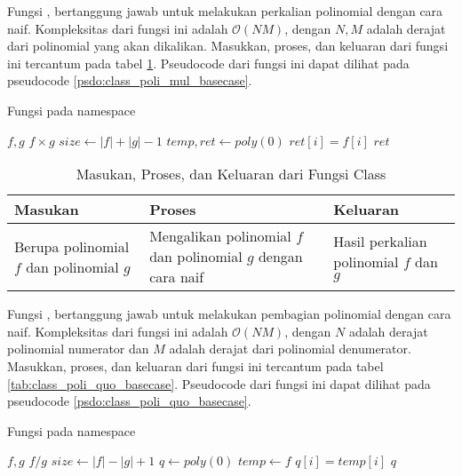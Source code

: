 \newpage

Fungsi , bertanggung jawab untuk melakukan perkalian polinomial dengan cara naif. Kompleksitas dari fungsi ini adalah $ \mathcal{O}{(NM)} $, dengan $ N , M $ adalah derajat dari polinomial yang akan dikalikan. Masukkan, proses, dan keluaran dari fungsi ini tercantum pada tabel \ref{tab:class_poli_mul_basecase}. Pseudocode dari fungsi ini dapat dilihat pada pseudocode \ref{psdo:class_poli_mul_basecase}.

\begin{algorithm}
	\caption{Fungsi  pada namespace }
	\label{psdo:class_poli_mul_basecase}
	\begin{algorithmic}[1]
		\Require $ f, g $
		\Ensure $ f \times g $
		\State $ size \leftarrow |f|+|g|-1 $
		\State $ temp, ret \leftarrow poly(0) $
				\State {}
			\EndIf
		\EndFor
			\State $ ret[i] = f[i] $
		\EndFor
		\State \Return $ ret $
	\end{algorithmic}
\end{algorithm}

\begin{table}[]	
	\Centering
	\begin{tabular}{|p{3cm}|p{3cm}|p{3cm}|}
	\hline
	Masukan & Proses & Keluaran \\ \hline
	Berupa polinomial $f$ dan polinomial $g$ & Mengalikan polinomial $f$ dan polinomial $g$ dengan cara naif & Hasil perkalian polinomial $f$ dan $g$\\ \hline
	\end{tabular}
	\caption{Masukan, Proses, dan Keluaran dari Fungsi  Class }
	\label{tab:class_poli_mul_basecase}
\end{table}

\newpage

Fungsi , bertanggung jawab untuk melakukan pembagian polinomial dengan cara naif. Kompleksitas dari fungsi ini adalah $ \mathcal{O}{(NM)} $, dengan $ N $ adalah derajat polinomial numerator dan $ M $ adalah derajat dari polinomial denumerator. Masukkan, proses, dan keluaran dari fungsi ini tercantum pada tabel \ref{tab:class_poli_quo_basecase}. Pseudocode dari fungsi ini dapat dilihat pada pseudocode \ref{psdo:class_poli_quo_basecase}.

\begin{algorithm}
	\caption{Fungsi  pada namespace }
	\label{psdo:class_poli_quo_basecase}
	\begin{algorithmic}[1]
		\Require $ f, g $
		\Ensure $ f / g $
		\State $ size \leftarrow |f|-|g|+1 $
		\State $ q \leftarrow poly(0) $
		\State $ temp \leftarrow f $
				\State {}
			\EndIf
		\EndFor
			\State $ q[i] = temp[i] $
		\EndFor
		\State \Return $ q $
	\end{algorithmic}
\end{algorithm}

